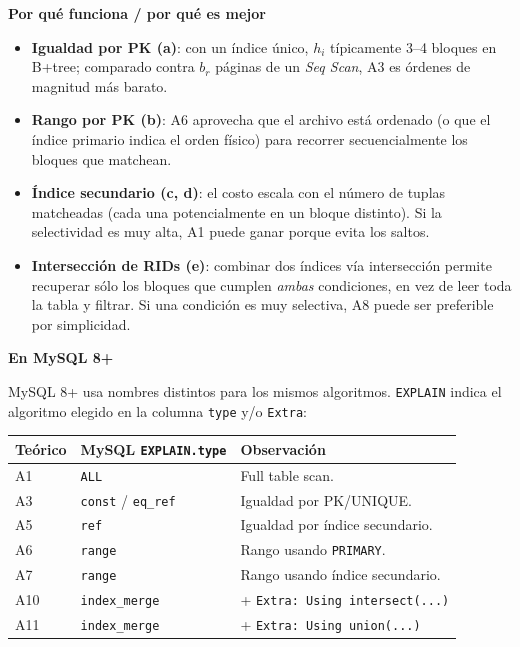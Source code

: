 \documentclass[11pt,a4paper]{article}
\newcommand{\itemcabecera}[1]{\noindent\textbf{#1}\par\medskip}
\newcommand{\bloquePorque}{\itemcabecera{Por qu\'e funciona / por qu\'e es mejor}}
\newcommand{\bloqueMySQL}{\itemcabecera{En MySQL 8+}}
\begin{document}
\bloquePorque

\begin{itemize}
    \item \textbf{Igualdad por PK (a)}: con un índice único, $h_i$ típicamente 3--4 bloques en B+tree; comparado contra $b_r$ páginas de un \emph{Seq Scan}, A3 es órdenes de magnitud más barato.
    \item \textbf{Rango por PK (b)}: A6 aprovecha que el archivo está ordenado (o que el índice primario indica el orden físico) para recorrer secuencialmente los bloques que matchean.
    \item \textbf{Índice secundario (c, d)}: el costo escala con el número de tuplas matcheadas (cada una potencialmente en un bloque distinto). Si la selectividad es muy alta, A1 puede ganar porque evita los saltos.
    \item \textbf{Intersección de RIDs (e)}: combinar dos índices vía intersección permite recuperar sólo los bloques que cumplen \emph{ambas} condiciones, en vez de leer toda la tabla y filtrar. Si una condición es muy selectiva, A8 puede ser preferible por simplicidad.
\end{itemize}

\bloqueMySQL

MySQL 8+ usa nombres distintos para los mismos algoritmos. \texttt{EXPLAIN} indica el algoritmo elegido en la columna \texttt{type} y/o \texttt{Extra}:

\begin{center}
\begin{tabular}{lll}
\toprule
Teórico & MySQL \texttt{EXPLAIN.type} & Observación \\
\midrule
A1  & \texttt{ALL}              & Full table scan. \\
A3  & \texttt{const} / \texttt{eq\_ref} & Igualdad por PK/UNIQUE. \\
A5  & \texttt{ref}              & Igualdad por índice secundario. \\
A6  & \texttt{range}            & Rango usando \texttt{PRIMARY}. \\
A7  & \texttt{range}            & Rango usando índice secundario. \\
A10 & \texttt{index\_merge}     & + \texttt{Extra: Using intersect(...)} \\
A11 & \texttt{index\_merge}     & + \texttt{Extra: Using union(...)} \\
\bottomrule
\end{tabular}
\end{center}
\end{document}
